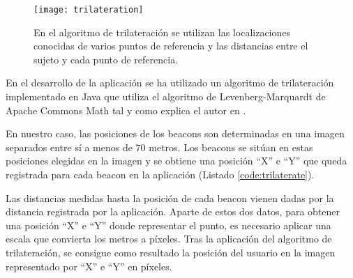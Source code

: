 \begin{figure}[H]
	\centering
	\texttt{[image: trilateration]}
	\caption{En el algoritmo de trilateración se utilizan las localizaciones conocidas de varios puntos de referencia y las distancias entre el sujeto y cada punto de referencia.}
	\label{fig:trilateration}
\end{figure}


En el desarrollo de la aplicación se ha utilizado un algoritmo de trilateración implementado en Java que utiliza el algoritmo de Levenberg-Marquardt \cite{URL::algoritmolm} de Apache Commons Math \cite{URL::apachemath} tal y como explica el autor en \cite{URL::trilateracion}. 


En nuestro caso, las posiciones de los beacons son determinadas en una imagen separados entre sí a menos de 70 metros. Los beacons se sitúan en estas posiciones elegidas en la imagen y se obtiene una posición ``X'' e ``Y'' que queda registrada para cada beacon en la aplicación (Listado \ref{code:trilaterate}). 

Las distancias medidas hasta la posición de cada beacon vienen dadas por la distancia registrada por la aplicación. Aparte de estos dos datos, para obtener una posición ``X'' e ``Y'' donde representar el punto, es necesario aplicar una escala que convierta los metros a píxeles. Tras la aplicación del algoritmo de trilateración, se consigue como resultado la posición del usuario en la imagen representado por ``X'' e ``Y'' en píxeles.

